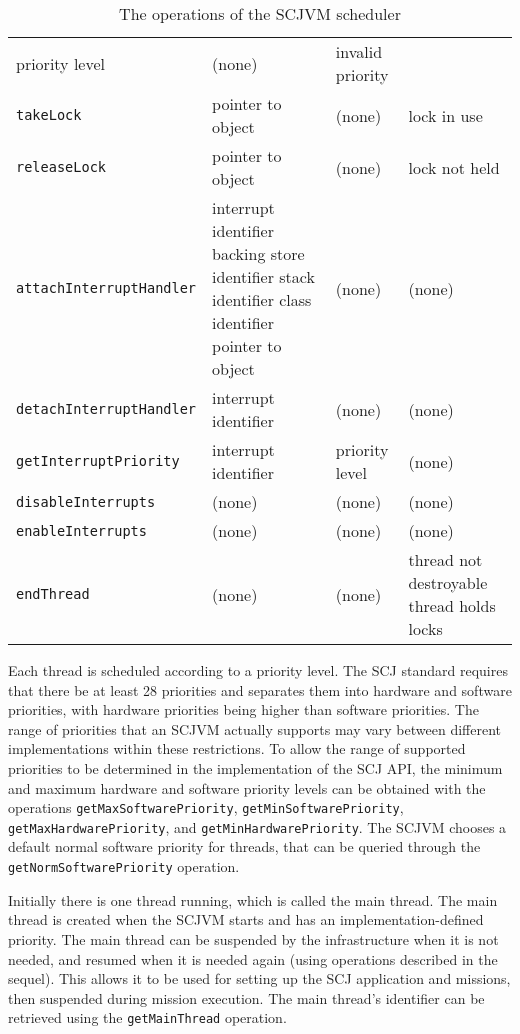\begin{table*}[ht]
\begin{tabular}{|l|p{3.2cm}|p{2.3cm}|p{3.6cm}|}
    priority level &
    (none) &
    invalid priority
    \\\texttt{takeLock} &
    pointer to object &
    (none) &
    lock in use
    \\\texttt{releaseLock} &
    pointer to object &
    (none) &
    lock not held
    \\\texttt{attachInterruptHandler} &
    interrupt identifier \newline
    backing store identifier \newline
    stack identifier \newline
    class identifier \newline
    pointer to object &
    (none) &
    (none)
    \\\texttt{detachInterruptHandler} &
    interrupt identifier &
    (none) &
    (none)
    \\\texttt{getInterruptPriority} &
    interrupt identifier &
    priority level &
    (none)
    \\\texttt{disableInterrupts} &
    (none) &
    (none) &
    (none)
    \\\texttt{enableInterrupts} &
    (none) &
    (none) &
    (none)
    \\\texttt{endThread} &
    (none) &
    (none) &
    thread not destroyable \newline
    thread holds locks
  \end{tabular}
  \caption{The operations of the SCJVM scheduler}
  \label{scheduler-table}
\end{table*}

Each thread is scheduled according to a priority level.
The SCJ standard requires that there be at least 28 priorities and
separates them into hardware and software priorities, with hardware
priorities being higher than software priorities.
The range of priorities that an SCJVM actually supports may vary
between different implementations within these restrictions.
To allow the range of supported priorities to be determined in the
implementation of the SCJ API, the minimum and maximum hardware and
software priority levels can be obtained with the operations
\texttt{getMaxSoftwarePriority},
\texttt{getMinSoftwarePriority},
\texttt{getMaxHardwarePriority}, and
\texttt{getMinHardwarePriority}.
The SCJVM chooses a default normal software priority for threads, that
can be queried through the \texttt{getNormSoftwarePriority}
operation.

Initially there is one thread running, which is called the main
thread.
The main thread is created when the SCJVM starts and has an
implementation-defined priority.
The main thread can be suspended by the infrastructure when it is not
needed, and resumed when it is needed again (using operations described
in the sequel).
This allows it to be used for setting up the SCJ application and
missions, then suspended during mission execution.
The main thread's identifier can be retrieved using the
\texttt{getMainThread} operation.

